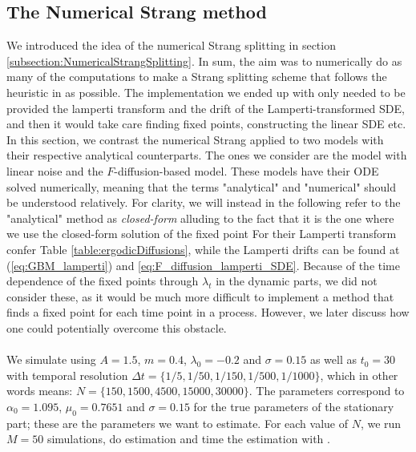 \subsection{The Numerical Strang method}
We introduced the idea of the numerical Strang splitting in section \ref{subsection:NumericalStrangSplitting}. In sum, the aim was to numerically do as many of the computations to make a Strang splitting scheme that follows the heuristic in \cite{SplittingSchemes} as possible. The implementation we ended up with only needed to be provided the lamperti transform and the drift of the Lamperti-transformed SDE, and then it would take care finding fixed points, constructing the linear SDE etc. In this section, we contrast the numerical Strang applied to two models with their respective analytical counterparts. The ones we consider are the model with linear noise and the $F$-diffusion-based model. 
These models have their ODE solved numerically, meaning that the terms "analytical" and "numerical" should be understood relatively. For clarity, we will instead in the following refer to the "analytical" method as \textit{closed-form} alluding to the fact that it is the one where we use the closed-form solution of the fixed point For their Lamperti transform confer Table \ref{table:ergodicDiffusions}, while the Lamperti drifts can be found at (\ref{eq:GBM_lamperti}) and \ref{eq:F_diffusion_lamperti_SDE}. Because of the time dependence of the fixed points through $\lambda_t$ in the dynamic parts, we did not consider these, as it would be much more difficult to implement a method that finds a fixed point for each time point in a process. However, we later discuss how one could potentially overcome this obstacle.\\\\
We simulate using $A = 1.5$, $m=0.4$, $\lambda_0 = -0.2$ and $\sigma =0.15$ as well as $t_0 = 30$ with temporal resolution $\Delta t = \{1/5, 1/50, 1/150, 1/500, 1/1000\}$, which in other words means: $N =  \{150, 1500, 4500, 15000, 30000\}$.  The parameters correspond to $\alpha_0 = 1.095$, $\mu_0 = 0.7651$ and $\sigma = 0.15$ for the true parameters of the stationary part; these are the parameters we want to estimate. For each value of $N$, we run $M = 50$ simulations, do estimation and time the estimation with .

